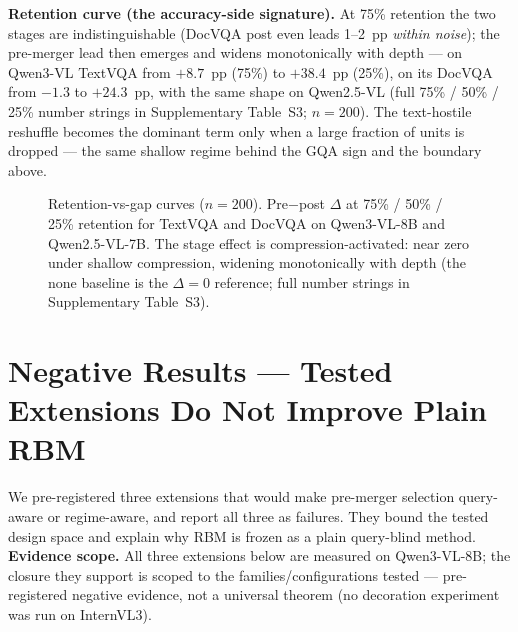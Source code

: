 \documentclass[sigconf,review,anonymous]{acmart}
\begin{document}
\textbf{Retention curve (the accuracy-side signature).} At 75\% retention the
two stages are indistinguishable (DocVQA post even leads 1--2~pp \emph{within
noise}); the pre-merger lead then emerges and widens monotonically with depth
--- on Qwen3-VL TextVQA from $+8.7$~pp (75\%) to $+38.4$~pp (25\%), on its
DocVQA from $-1.3$ to $+24.3$~pp, with the same shape on Qwen2.5-VL (full
75\% / 50\% / 25\% number strings in Supplementary Table~S3; $n = 200$). The
text-hostile reshuffle becomes the dominant term only when a large fraction of
units is dropped --- the same shallow regime behind the GQA sign and the
boundary above.

\begin{figure}[t]
  \centering
  \caption{Retention-vs-gap curves ($n = 200$). Pre$-$post $\Delta$ at 75\% /
    50\% / 25\% retention for TextVQA and DocVQA on Qwen3-VL-8B and
    Qwen2.5-VL-7B. The stage effect is compression-activated: near zero under
    shallow compression, widening monotonically with depth (the none baseline is
    the $\Delta = 0$ reference; full number strings in Supplementary Table~S3).}
  \label{fig:fig3}
\end{figure}

\section{Negative Results --- Tested Extensions Do Not Improve Plain RBM}\label{sec:negative}

We pre-registered three extensions that would make pre-merger selection
query-aware or regime-aware, and report all three as failures. They
bound the tested design space and explain why RBM is frozen as
a plain query-blind method. \textbf{Evidence scope.} All three extensions below
are measured on Qwen3-VL-8B; the
closure they support is scoped to the families/configurations tested ---
pre-registered negative evidence, not a universal theorem (no decoration
experiment was run on InternVL3).
\end{document}
